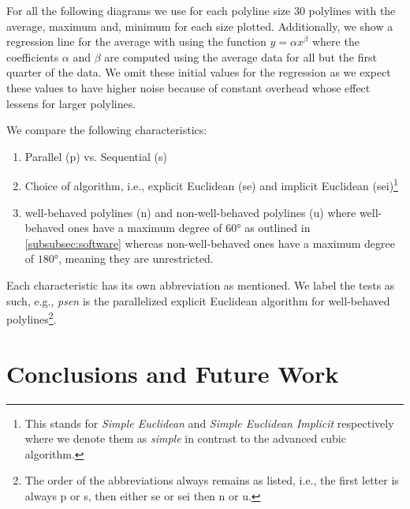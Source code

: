For all the following diagrams we use for each polyline size 30 polylines with the average, maximum and, minimum for each size plotted. Additionally, we show a regression line for the average with using the function \(y = \alpha x^\beta\) where the coefficients \(\alpha\) and \(\beta\) are computed using the average data for all but the first quarter of the data. We omit these initial values for the regression as we expect these values to have higher noise because of constant overhead whose effect lessens for larger polylines. 

We compare the following characteristics: 
\begin{enumerate}
  \item Parallel (p) vs. Sequential (s)
  \item Choice of algorithm, i.e., explicit Euclidean (se) and implicit Euclidean (sei)\footnote{This stands for \emph{Simple Euclidean} and \emph{Simple Euclidean Implicit} respectively where we denote them as \emph{simple} in contrast to the advanced cubic algorithm.}
  \item well-behaved polylines (n) and non-well-behaved polylines (u) where well-behaved ones have a maximum degree of \(60\)° as outlined in \cref{subsubsec:software} whereas non-well-behaved ones have a maximum degree of \(180\)°, meaning they are unrestricted. 
\end{enumerate}

Each characteristic has its own abbreviation as mentioned. We label the tests as such, e.g., \emph{psen} is the parallelized explicit Euclidean algorithm for well-behaved polylines\footnote{The order of the abbreviations always remains as listed, i.e., the first letter is always p or s, then either se or sei then n or u.}.





\section{Conclusions and Future Work}
\label{sec:discussion_conclusion}




